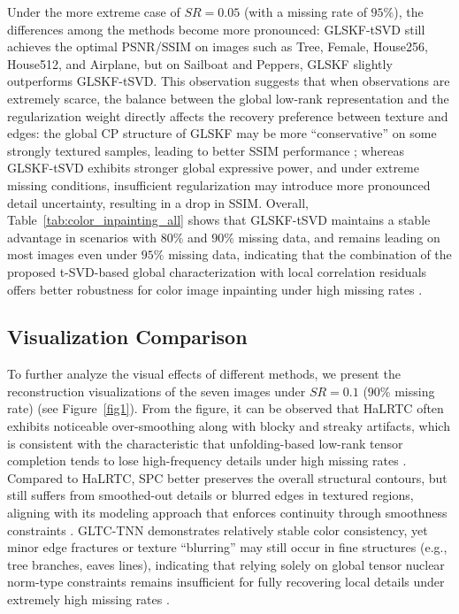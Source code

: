 \documentclass[a4paper,12pt]{article}
\numberwithin{equation}{section}
\numberwithin{algorithm}{section}
\theoremstyle{remark}
\theoremstyle{definition}
\begin{document}
Under the more extreme case of $SR=0.05$ (with a missing rate of $95\%$), the differences among the methods become more pronounced: GLSKF-tSVD still achieves the optimal PSNR/SSIM on images such as Tree, Female, House256, House512, and Airplane,  
but on Sailboat and Peppers, GLSKF slightly outperforms GLSKF-tSVD.  
This observation suggests that when observations are extremely scarce, the balance between the global low-rank representation and the regularization weight directly affects the recovery preference between texture and edges: the global CP structure of GLSKF may be more “conservative” on some strongly textured samples, leading to better SSIM performance \cite{lei2024glskf};  
whereas GLSKF-tSVD exhibits stronger global expressive power, and under extreme missing conditions, insufficient regularization may introduce more pronounced detail uncertainty, resulting in a drop in SSIM.  
Overall, Table~\ref{tab:color_inpainting_all} shows that GLSKF-tSVD maintains a stable advantage in scenarios with $80\%$ and $90\%$ missing data, and remains leading on most images even under $95\%$ missing data,  
indicating that the combination of the proposed t-SVD-based global characterization with local correlation residuals offers better robustness for color image inpainting under high missing rates \cite{lei2024glskf}.

\subsection{Visualization Comparison}  
To further analyze the visual effects of different methods, we present the reconstruction visualizations of the seven images under $SR=0.1$ ($90\%$ missing rate) (see Figure~\ref{fig1}). From the figure, it can be observed that HaLRTC often exhibits noticeable over-smoothing along with blocky and streaky artifacts, which is consistent with the characteristic that unfolding-based low-rank tensor completion tends to lose high-frequency details under high missing rates \cite{liu2013tensor}. Compared to HaLRTC, SPC better preserves the overall structural contours, but still suffers from smoothed-out details or blurred edges in textured regions, aligning with its modeling approach that enforces continuity through smoothness constraints \cite{yokota2016smooth}. GLTC-TNN demonstrates relatively stable color consistency, yet minor edge fractures or texture “blurring” may still occur in fine structures (e.g., tree branches, eaves lines), indicating that relying solely on global tensor nuclear norm-type constraints remains insufficient for fully recovering local details under extremely high missing rates \cite{chen2025geotensor}.
\end{document}
